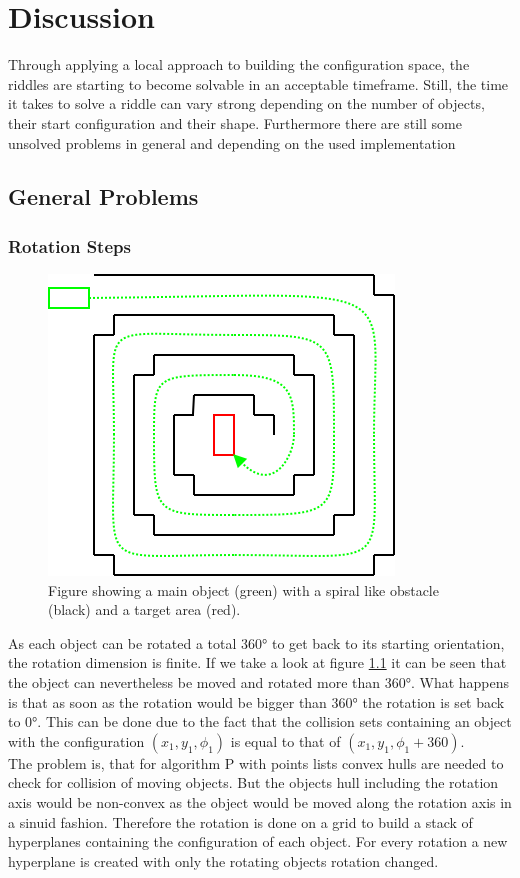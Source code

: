 \chapter{Discussion}
Through applying a local approach to building the configuration space, the riddles are starting to become solvable in an acceptable timeframe.
Still, the time it takes to solve a riddle can vary strong depending on the number of objects, their start configuration and their shape. Furthermore there are still some unsolved problems in general and depending on the used implementation

\section{General Problems}
\subsection{Rotation Steps}
\begin{figure}[H]
\centering
\includegraphics[scale=0.5]{endlessRot}
\caption{Figure showing a main object (green) with a spiral like obstacle (black) and a target area (red).}
\label{rotFigure}
\end{figure}
As each object can be rotated a total 360° to get back to its starting orientation, the rotation dimension is finite. If we take a look at figure \ref{rotFigure} it can be seen that the object can nevertheless be moved and rotated more than 360°. What happens is that as soon as the rotation would be bigger than 360° the rotation is set back to 0°. This can be done due to the fact that the collision sets containing an object with the configuration $(x_1 , y_1, \phi_1)$ is equal to that of $(x_1, y_1, \phi_1 + 360)$.\\
The problem is, that for algorithm P with points lists convex hulls are needed to check for collision of moving objects. But the objects hull including the rotation axis would be non-convex as the object would be moved along the rotation axis in a sinuid fashion. Therefore the rotation is done on a grid to build a stack of hyperplanes containing the configuration of each object. For every rotation a new hyperplane is created with only the rotating objects rotation changed.\\
